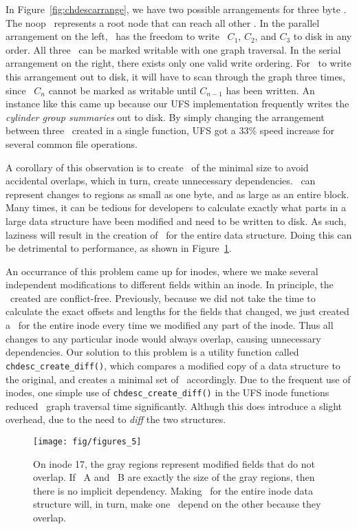 In Figure~\ref{fig:chdescarrange}, we have two possible arrangements for three
byte \chdescs. The noop \chdesc\ represents a root node that can reach all
other \chdescs. In the parallel arrangement on the left, \Kudos\ has the
freedom to write \chdescs\ $C_1$, $C_2$, and $C_3$ to disk in any order. All
three \chdescs\ can be marked writable with one graph traversal. In the serial
arrangement on the right, there exists only one valid write ordering. For
\Kudos\ to write this arrangement out to disk, it will have to scan through
the graph three times, since \chdesc\ $C_n$ cannot be marked as writable until
$C_{n-1}$ has been written.
An instance like this came up because our UFS implementation frequently writes
the \emph{cylinder group summaries} out to disk. By simply changing the
arrangement between three \chdescs\ created in a single function, UFS got a
33\% speed increase for several common file operations.

A corollary of this observation is to create \chdescs\ of the minimal size to
avoid accidental overlaps, which in turn, create unnecessary dependencies.
\Chdescs\ can represent changes to regions as small as one byte, and as large
as an entire block. Many times, it can be tedious for developers to calculate
exactly what parts in a large data structure have been modified and need to be
written to disk. As such, laziness will result in the creation of \chdescs\
for the entire data structure. Doing this can be detrimental to performance,
as shown in Figure~\ref{fig:overlap}.

An occurrance of this problem came up for inodes, where we make several
independent modifications to different fields within an inode. In principle,
the \chdescs\ created are conflict-free. Previously, because we did not take
the time to calculate the exact offsets and lengths for the fields that
changed, we just created a \chdesc\ for the entire inode every time we modified
any part of the inode. Thus all changes to any particular inode would always
overlap, causing unnecessary dependencies. Our solution to this problem is a
utility function called \texttt{chdesc\_create\_diff()}, which compares a
modified copy of a data structure to the original, and creates a minimal set of
\chdescs\ accordingly. Due to the frequent use of inodes, one simple use of
\texttt{chdesc\_create\_diff()} in the UFS inode functions reduced \chdesc\
graph traversal time significantly. Althugh this does introduce a slight
overhead, due to the need to \emph{diff} the two structures.

\begin{figure}[htb]
  \centering
  \texttt{[image: fig/figures\_5]}
  \caption{\label{fig:overlap} On inode 17, the gray regions represent
  modified fields that do not overlap. If \chdesc\ A and \chdesc\ B are
  exactly the size of the gray regions, then there is no implicit dependency.
  Making \chdescs\ for the entire inode data structure will, in turn, make
  one \chdesc\ depend on the other because they overlap.}
\end{figure}


